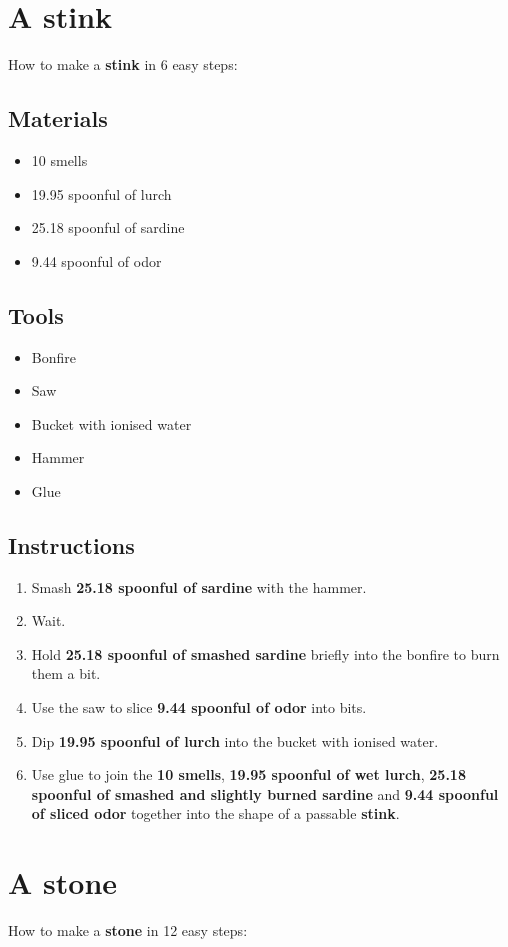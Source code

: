 \documentclass{article}
\begin{document}
\section{A stink}How to make a \textbf{stink} in 6 easy steps:

\subsection{Materials}\begin{itemize}
\item 
10 smells
\item 
19.95 spoonful of lurch
\item 
25.18 spoonful of sardine
\item 
9.44 spoonful of odor
\end{itemize}
\subsection{Tools}\begin{itemize}
\item 
Bonfire
\item 
Saw
\item 
Bucket with ionised water
\item 
Hammer
\item 
Glue
\end{itemize}
\subsection{Instructions}\begin{enumerate}
\item 
Smash \textbf{25.18 spoonful of sardine} with the hammer.
\item 
Wait.
\item 
Hold \textbf{25.18 spoonful of smashed sardine} briefly into the bonfire to burn them a bit.
\item 
Use the saw to slice \textbf{9.44 spoonful of odor} into bits.
\item 
Dip \textbf{19.95 spoonful of lurch} into the bucket with ionised water.
\item 
Use glue to join the \textbf{10 smells}, \textbf{19.95 spoonful of wet lurch}, \textbf{25.18 spoonful of smashed and slightly burned sardine} and \textbf{9.44 spoonful of sliced odor} together into the shape of a passable \textbf{stink}.
\end{enumerate}
\newpage
\section{A stone}How to make a \textbf{stone} in 12 easy steps:
\end{document}
